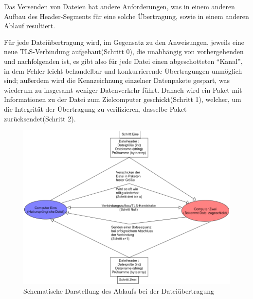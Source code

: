 Das Versenden von Dateien hat andere Anforderungen, was in einem anderen Aufbau des Header-Segments für eine solche Übertragung, sowie in einem anderen Ablauf resultiert.\par
Für jede Dateiübertragung wird, im Gegensatz zu den Anweisungen, jeweils eine neue TLS-Verbindung aufgebaut(Schritt 0), die unabhängig von vorhergehenden und nachfolgenden ist, es gibt also für jede Datei einen abgeschotteten "`Kanal"', in dem Fehler leicht behandelbar und konkurrierende Übertragungen unmöglich sind; außerdem wird die Kennzeichnung einzelner Datenpakete gespart, was wiederum zu insgesamt weniger Datenverkehr führt.
Danach wird ein Paket mit Informationen zu der Datei zum Zielcomputer geschickt(Schritt 1), welcher, um die Integrität der Übertragung zu verifizieren, dasselbe Paket zurücksendet(Schritt 2).\\

\begin{figure}
\includegraphics[scale=.4]{diagramFileProtocol}
\caption{Schematische Darstellung des Ablaufs bei der Dateiübertragung}
\label{file_diagram}
\end{figure}

